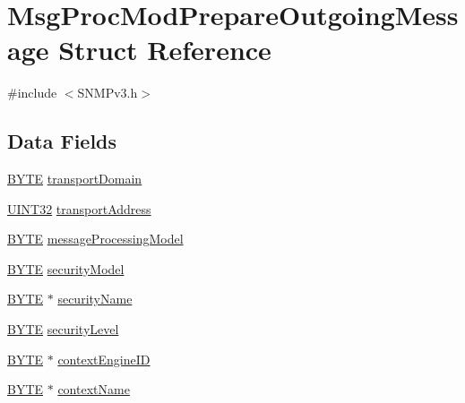 \hypertarget{struct_msg_proc_mod_prepare_outgoing_message}{}\section{Msg\+Proc\+Mod\+Prepare\+Outgoing\+Message Struct Reference}
\label{struct_msg_proc_mod_prepare_outgoing_message}


{\ttfamily \#include $<$S\+N\+M\+Pv3.\+h$>$}

\subsection*{Data Fields}
\begin{DoxyCompactItemize}
\item 
\hyperlink{_generic_type_defs_8h_a4ae1dab0fb4b072a66584546209e7d58}{B\+Y\+T\+E} \hyperlink{struct_msg_proc_mod_prepare_outgoing_message_a9caa74f4cfb6917bbf209d8f1de38a9f}{transport\+Domain}
\item 
\hyperlink{_generic_type_defs_8h_a1720f33f59b583f0c2ed071815623a86}{U\+I\+N\+T32} \hyperlink{struct_msg_proc_mod_prepare_outgoing_message_a4943d5b448452380d516089d6a59700c}{transport\+Address}
\item 
\hyperlink{_generic_type_defs_8h_a4ae1dab0fb4b072a66584546209e7d58}{B\+Y\+T\+E} \hyperlink{struct_msg_proc_mod_prepare_outgoing_message_a47f1a1b8f7a3fe5623fe37df094ac032}{message\+Processing\+Model}
\item 
\hyperlink{_generic_type_defs_8h_a4ae1dab0fb4b072a66584546209e7d58}{B\+Y\+T\+E} \hyperlink{struct_msg_proc_mod_prepare_outgoing_message_ac19ed44216346e9d6c50819813db6867}{security\+Model}
\item 
\hyperlink{_generic_type_defs_8h_a4ae1dab0fb4b072a66584546209e7d58}{B\+Y\+T\+E} $\ast$ \hyperlink{struct_msg_proc_mod_prepare_outgoing_message_a4a48a8746988a1f761c3e9eadcc20463}{security\+Name}
\item 
\hyperlink{_generic_type_defs_8h_a4ae1dab0fb4b072a66584546209e7d58}{B\+Y\+T\+E} \hyperlink{struct_msg_proc_mod_prepare_outgoing_message_a9314d7b462ce4cc59202ed48fcdd9945}{security\+Level}
\item 
\hyperlink{_generic_type_defs_8h_a4ae1dab0fb4b072a66584546209e7d58}{B\+Y\+T\+E} $\ast$ \hyperlink{struct_msg_proc_mod_prepare_outgoing_message_aa75baf2d001f5d5ac415eed279fd6e85}{context\+Engine\+I\+D}
\item 
\hyperlink{_generic_type_defs_8h_a4ae1dab0fb4b072a66584546209e7d58}{B\+Y\+T\+E} $\ast$ \hyperlink{struct_msg_proc_mod_prepare_outgoing_message_af55ce5882ccbc8435fb33f1020c74550}{context\+Name}

\end{DoxyCompactItemize}
